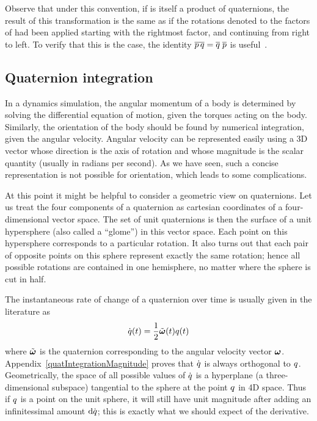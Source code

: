 Observe that under this convention, if  is itself a product of quaternions, the
result of this transformation is the same as if the rotations denoted to the factors
of  had been applied starting with the rightmost factor, and continuing from
right to left. To verify that this is the case, the identity
$\overline{\mbox{$p$}\, \mbox{$q$}} = \mbox{$\overline{q}$}\; \mbox{$\overline{p}$}$
is useful~\cite{MathWorld:Quaternion}.

\subsection{Quaternion integration}

In a dynamics simulation, the angular momentum of a body is determined by solving the
differential equation of motion, given the torques acting on the body. Similarly, the
orientation of the body should be found by numerical integration, given the angular
velocity. Angular velocity can be represented easily using a 3D vector whose
direction is the axis of rotation and whose magnitude is the scalar quantity (usually in
radians per second). As we have seen, such a concise representation is not possible for
orientation, which leads to some complications.

At this point it might be helpful to consider a geometric view on quaternions. Let us treat
the four components of a quaternion as cartesian coordinates of a four-dimensional vector
space. The set of unit quaternions is then the surface of a unit hypersphere (also called a
``glome''\cite{MathWorld:4D}) in this vector space. Each point on this hypersphere
corresponds to a particular rotation. It also turns out that each pair of
opposite points on this sphere represent exactly the same rotation; hence all possible
rotations are contained in one hemisphere, no matter where the sphere is cut in half.

The instantaneous rate of change of a quaternion  over time is usually given
in the literature as
\begin{equation}
\label{quatRateOfChange}
\dot{\q{q}}(t) = \frac{1}{2}\tilde{\ve{\omega}}(t)\q{q}(t)
\end{equation}
where $\tilde{\ve{\omega}}$ is the quaternion corresponding to the angular velocity
vector $\ve{\omega}$. Appendix~\ref{quatIntegrationMagnitude} proves that $\dot{\mbox{$q$}}$ is
always orthogonal to $\mbox{$q$}$. Geometrically, the space of all possible values of $\dot{\mbox{$q$}}$ is
a hyperplane (a three-dimensional subspace) tangential to the sphere at the point $\mbox{$q$}$ in
4D space. Thus if $\mbox{$q$}$ is a point on the unit sphere, it will still have unit magnitude after
adding an infinitessimal amount $\mbox{$\mathrm{d}$}\dot{\mbox{$q$}}$; this is exactly what we should expect of the
derivative.

